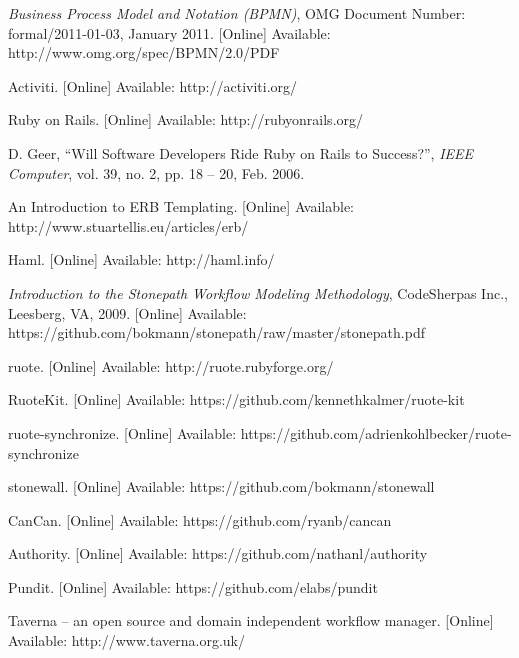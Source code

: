 \renewcommand{\bibname}{References}
\begin{thebibliography}{99}

\textit{Business Process Model and Notation
(BPMN)}, OMG Document Number: formal/2011-01-03, January 2011. [Online] Available: http://www.omg.org/spec/BPMN/2.0/PDF

Activiti. [Online] Available: http://activiti.org/

Ruby on Rails. [Online] Available: http://rubyonrails.org/

D. Geer, ``Will Software Developers Ride Ruby on Rails to Success?'', \textit{IEEE Computer}, vol. 39, no. 2, pp. 18 -- 20, Feb. 2006.

An Introduction to ERB Templating. [Online] Available: http://www.stuartellis.eu/articles/erb/

Haml. [Online] Available: http://haml.info/

\textit{Introduction to the Stonepath Workflow Modeling Methodology},
CodeSherpas Inc., Leesberg, VA, 2009. [Online] Available: https://github.com/bokmann/stonepath/raw/master/stonepath.pdf

ruote. [Online] Available: http://ruote.rubyforge.org/

RuoteKit. [Online] Available: https://github.com/kennethkalmer/ruote-kit

ruote-synchronize. [Online] Available: https://github.com/adrienkohlbecker/ruote-synchronize

stonewall. [Online] Available: https://github.com/bokmann/stonewall

CanCan. [Online] Available: https://github.com/ryanb/cancan

Authority. [Online] Available: https://github.com/nathanl/authority

Pundit. [Online] Available: https://github.com/elabs/pundit

Taverna -- an open source and domain independent workflow manager. [Online] Available: http://www.taverna.org.uk/

\end{thebibliography}

%    
%    

